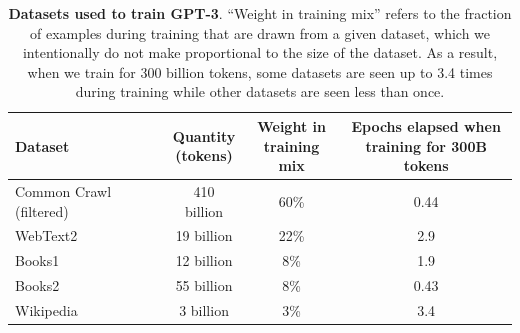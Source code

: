 \begin{table}

    \begin{center}
        \begin{tabular}{lccc}
        \toprule
        Dataset & \shortstack{Quantity \\ (tokens)} & \shortstack{Weight in \\training mix} & \shortstack{Epochs elapsed when \\ training for 300B tokens} \\ 
        \midrule
        Common Crawl (filtered) & 410 billion & 60\% & 0.44\\ 
        WebText2 & 19 billion & 22\% &  2.9 \\
        Books1 & 12 billion & 8\% & 1.9 \\ 
        Books2 & 55 billion & 8\% & 0.43 \\ 
        Wikipedia & 3 billion & 3\% & 3.4 \\ 
        \bottomrule
        \end{tabular}
    \end{center}
    \caption{\textbf{Datasets used to train GPT-3}.  ``Weight in training mix'' refers to the fraction of examples during training that are drawn from a given dataset, which we intentionally do not make proportional to the size of the dataset.  As a result, when we train for 300 billion tokens, some datasets are seen up to 3.4 times during training while other datasets are seen less than once.}
    \label{table:dataset}
\end{table}